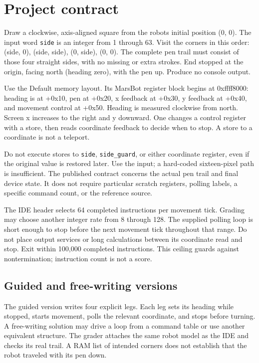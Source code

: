 \section{Project contract}\label{006-marsbot-square-assignment-draw-a-square-with-coordinate-feedback}

Draw a clockwise, axis-aligned square from the robot\textquotesingle s
initial position (0, 0). The input word \texttt{side} is an integer from
1 through 63. Visit the corners in this order: (side, 0), (side, side),
(0, side), (0, 0). The complete pen trail must consist of those four
straight sides, with no missing or extra strokes. End stopped at the
origin, facing north (heading zero), with the pen up. Produce no console
output.

Use the Default memory layout. Its MarsBot register block begins at
0xffff8000: heading is at +0x10, pen at +0x20, x feedback at +0x30, y
feedback at +0x40, and movement control at +0x50. Heading is measured
clockwise from north. Screen x increases to the right and y downward.
One changes a control register with a store, then reads coordinate
feedback to decide when to stop. A store to a coordinate is not a
teleport.

Do not execute stores to \texttt{side}, \texttt{side\_guard}, or either
coordinate register, even if the original value is restored later. Use
the input; a hard-coded sixteen-pixel path is insufficient. The
published contract concerns the actual pen trail and final device state.
It does not require particular scratch registers, polling labels, a
specific command count, or the reference source.

The IDE header selects 64 completed instructions per movement tick.
Grading may choose another integer rate from 8 through 128. The supplied
polling loop is short enough to stop before the next movement tick
throughout that range. Do not place output services or long calculations
between its coordinate read and stop. Exit within 100,000 completed
instructions. This ceiling guards against nontermination; instruction
count is not a score.

\subsection{Guided and free-writing
  versions}\label{006-marsbot-square-assignment-guided-and-free-writing-versions}

The guided version writes four explicit legs. Each leg sets its heading
while stopped, starts movement, polls the relevant coordinate, and stops
before turning. A free-writing solution may drive a loop from a command
table or use another equivalent structure. The grader attaches the same
robot model as the IDE and checks its real trail. A RAM list of intended
corners does not establish that the robot traveled with its pen down.

